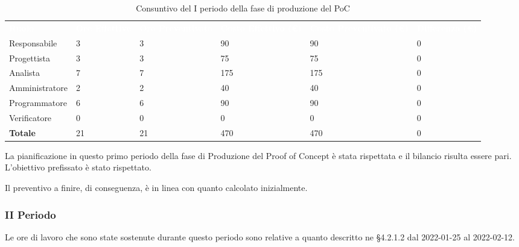 \begin{table}[H]
\begin{center}
\renewcommand{\arraystretch}{1.5}
\begin{tabular}{ m{}<{\centering}  m{}<{\centering} m{}<{\centering} m{}<{\centering} m{}<{\centering} m{}<{\centering}}
	\rowcolor{darkblue}
	\textcolor{white}{\textbf{Ruolo}} & \textcolor{white}{\textbf{Ore Effettive}} & \textcolor{white}{\textbf{Ore Preventivate}}&\textcolor{white}{\textbf{Costo Effettivo (\euro)}}&\textcolor{white}{\textbf{Costo Preventivato (\euro)}}&\textcolor{white}{\textbf{Differenza (\euro)}}\\ 
	
	Responsabile  & 3 & 3 & 90 & 90 & 0 \\	
	
	Progettista & 3 & 3 & 75 & 75 & 0 \\
	
	Analista & 7 & 7 & 175 & 175 & 0 \\

	Amministratore & 2 & 2 & 40 & 40 & 0 \\
	
	Programmatore & 6 & 6 & 90 & 90 &  0 \\
	
	Verificatore & 0 & 0 & 0 & 0 & 0 \\
	
	\textbf{Totale} & 21 & 21 & 470 & 470 & 0 \\
	
\end{tabular}
\caption{Consuntivo del I periodo della fase di produzione del PoC}
\end{center}
\end{table}

La pianificazione in questo primo periodo della fase di Produzione del Proof of Concept è stata rispettata e il bilancio risulta essere pari. L'obiettivo prefissato è stato rispettato.

Il preventivo a finire, di conseguenza, è in linea con quanto calcolato inizialmente.

\pagebreak

\subsubsection{II Periodo}
Le ore di lavoro che sono state sostenute durante questo periodo sono relative a quanto descritto ne §4.2.1.2 dal 2022-01-25 al 2022-02-12.

